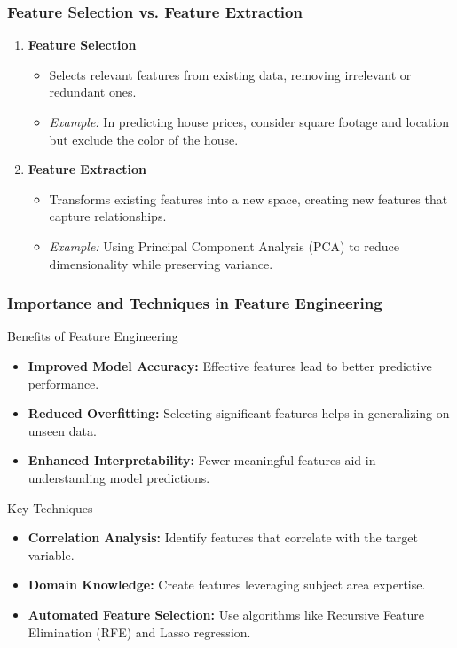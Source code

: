 \documentclass[aspectratio=169]{beamer}
\begin{document}
\begin{frame}[fragile]
    \frametitle{Feature Selection vs. Feature Extraction}
    \begin{enumerate}
        \item \textbf{Feature Selection}
        \begin{itemize}
            \item Selects relevant features from existing data, removing irrelevant or redundant ones.
            \item \textit{Example:} In predicting house prices, consider square footage and location but exclude the color of the house.
        \end{itemize}

        \item \textbf{Feature Extraction}
        \begin{itemize}
            \item Transforms existing features into a new space, creating new features that capture relationships.
            \item \textit{Example:} Using Principal Component Analysis (PCA) to reduce dimensionality while preserving variance.
        \end{itemize}
    \end{enumerate}
\end{frame}

\begin{frame}[fragile]
    \frametitle{Importance and Techniques in Feature Engineering}
    \begin{block}{Benefits of Feature Engineering}
        \begin{itemize}
            \item \textbf{Improved Model Accuracy:} Effective features lead to better predictive performance.
            \item \textbf{Reduced Overfitting:} Selecting significant features helps in generalizing on unseen data.
            \item \textbf{Enhanced Interpretability:} Fewer meaningful features aid in understanding model predictions.
        \end{itemize}
    \end{block}

    \begin{block}{Key Techniques}
        \begin{itemize}
            \item \textbf{Correlation Analysis:} Identify features that correlate with the target variable.
            \item \textbf{Domain Knowledge:} Create features leveraging subject area expertise.
            \item \textbf{Automated Feature Selection:} Use algorithms like Recursive Feature Elimination (RFE) and Lasso regression.
        \end{itemize}
    \end{block}
\end{frame}
\end{document}
